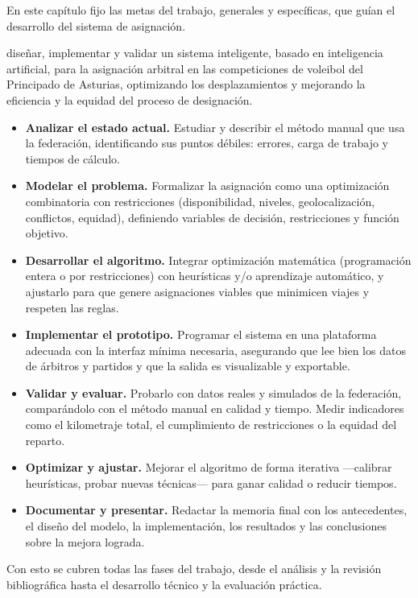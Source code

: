 \documentclass[11pt,a4paper,spanish]{book}
\numberwithin{equation}{chapter}
\numberwithin{figure}{chapter}
\numberwithin{table}{chapter}
\begin{document}
En este capítulo fijo las metas del trabajo, generales y específicas, que guían el desarrollo del sistema de asignación.

 diseñar, implementar y validar un sistema inteligente, basado en inteligencia artificial, para la asignación arbitral en las competiciones de voleibol del Principado de Asturias, optimizando los desplazamientos y mejorando la eficiencia y la equidad del proceso de designación.

\vspace{0.3cm}

\begin{itemize}
\item {\bf Analizar el estado actual.} Estudiar y describir el método manual que usa la federación, identificando sus puntos débiles: errores, carga de trabajo y tiempos de cálculo.
\item {\bf Modelar el problema.} Formalizar la asignación como una optimización combinatoria con restricciones (disponibilidad, niveles, geolocalización, conflictos, equidad), definiendo variables de decisión, restricciones y función objetivo.
\item {\bf Desarrollar el algoritmo.} Integrar optimización matemática (programación entera o por restricciones) con heurísticas y/o aprendizaje automático, y ajustarlo para que genere asignaciones viables que minimicen viajes y respeten las reglas.
\item {\bf Implementar el prototipo.} Programar el sistema en una plataforma adecuada con la interfaz mínima necesaria, asegurando que lee bien los datos de árbitros y partidos y que la salida es visualizable y exportable.
\item {\bf Validar y evaluar.} Probarlo con datos reales y simulados de la federación, comparándolo con el método manual en calidad y tiempo. Medir indicadores como el kilometraje total, el cumplimiento de restricciones o la equidad del reparto.
\item {\bf Optimizar y ajustar.} Mejorar el algoritmo de forma iterativa —calibrar heurísticas, probar nuevas técnicas— para ganar calidad o reducir tiempos.
\item {\bf Documentar y presentar.} Redactar la memoria final con los antecedentes, el diseño del modelo, la implementación, los resultados y las conclusiones sobre la mejora lograda.
\end{itemize}

Con esto se cubren todas las fases del trabajo, desde el análisis y la revisión bibliográfica hasta el desarrollo técnico y la evaluación práctica.
\end{document}
